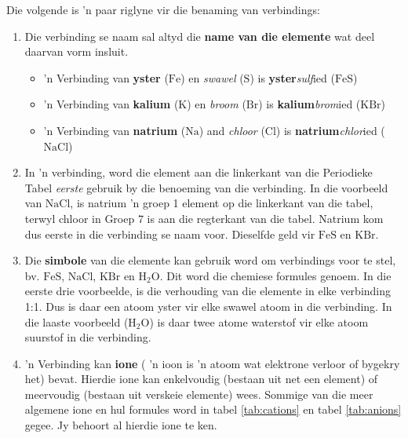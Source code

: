       \label{m38708*id64033}Die volgende is 'n paar riglyne vir die benaming van verbindings:\par 
      \label{m38708*id64037}\begin{enumerate}[noitemsep, label=\textbf{\arabic*}. ] 
            \label{m38708*uid35}\item Die verbinding se naam sal altyd die \textbf{name van die elemente} wat deel daarvan vorm insluit.
\label{m38708*id64059}\begin{itemize}[noitemsep]
            \label{m38708*uid36}\item 'n Verbinding van \textbf{yster} ($\text{Fe}$) en \textsl{swawel} ($\text{S}$) is \textbf{yster}\textsl{sulf}ied ($\text{FeS}$)
\label{m38708*uid37}\item 'n Verbinding van \textbf{kalium} ($\text{K}$) en \textsl{broom} ($\text{Br}$) is \textbf{kalium}\textsl{brom}ied ($\text{KBr}$)
\label{m38708*uid38}\item 'n Verbinding van \textbf{natrium} ($\text{Na}$) and \textsl{chloor} ($\text{Cl}$) is \textbf{natrium}\textsl{chlor}ied ($\text{NaCl}$)
\end{itemize}
        \label{m38708*uid39}\item In 'n verbinding, word die element aan die linkerkant van die Periodieke Tabel \textsl{eerste} gebruik by die benoeming van die verbinding. In die voorbeeld van $\text{NaCl}$, is natrium 'n groep 1 element op die linkerkant van die tabel, terwyl chloor in Groep 7 is aan die regterkant van die tabel. Natrium kom dus eerste in die verbinding se naam voor. Dieselfde geld vir $\text{FeS}$ en $\text{KBr}$.
\label{m38708*uid40}\item Die \textbf{simbole} van die elemente kan gebruik word om verbindings voor te stel, bv. $\text{FeS}$, $\text{NaCl}$, $\text{KBr}$ en $\text{H}{}_{2}\text{O}$. Dit word die chemiese formules genoem. In die eerste drie voorbeelde, is die verhouding van die elemente in elke verbinding 1:1. Dus is daar een atoom yster vir elke swawel atoom in die verbinding. In die laaste voorbeeld ($\text{H}{}_{2}\text{O}$) is daar twee atome waterstof vir elke atoom suurstof in die verbinding.
\item 'n Verbinding kan \textbf{ione} ( 'n ioon is 'n atoom wat elektrone verloor of bygekry het) bevat. Hierdie ione kan enkelvoudig (bestaan uit net een element) of meervoudig (bestaan uit verskeie elemente) wees. Sommige van die meer algemene ione en hul formules word in tabel \ref{tab:cations} en tabel \ref{tab:anions} gegee. Jy behoort al hierdie ione te ken.


\end{enumerate}

